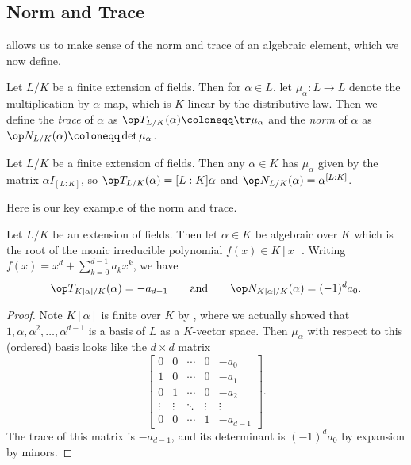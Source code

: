 \documentclass[../notes.tex]{subfiles}
\begin{document}
\subsection{Norm and Trace}
 allows us to make sense of the norm and trace of an algebraic element, which we now define.
\begin{definition}
	Let $L/K$ be a finite extension of fields. Then for $\alpha\in L$, let $\mu_\alpha\colon L\to L$ denote the multiplication-by-$\alpha$ map, which is $K$-linear by the distributive law. Then we define the \textit{trace} of $\alpha$ as $\op T_{L/K}(\alpha)\coloneqq\tr\mu_\alpha$ and the \textit{norm} of $\alpha$ as $\op N_{L/K}(\alpha)\coloneqq\det\mu_\alpha$.
\end{definition}
\begin{example}
	Let $L/K$ be a finite extension of fields. Then any $\alpha\in K$ has $\mu_\alpha$ given by the matrix $\alpha I_{[L:K]}$, so $\op T_{L/K}(\alpha)=[L:K]\alpha$ and $\op N_{L/K}(\alpha)=\alpha^{[L:K]}$.
\end{example}
Here is our key example of the norm and trace.
\begin{proposition} \label{prop:norm-and-tr-by-min-poly}
	Let $L/K$ be an extension of fields. Then let $\alpha\in K$ be algebraic over $K$ which is the root of the monic irreducible polynomial $f(x)\in K[x]$. Writing $f(x)=x^d+\sum_{k=0}^{d-1}a_kx^k$, we have
	\[\op T_{K[\alpha]/K}(\alpha)=-a_{d-1}\qquad\text{and}\qquad\op N_{K[\alpha]/K}(\alpha)=(-1)^da_0.\]
\end{proposition}
\begin{proof}
	Note $K[\alpha]$ is finite over $K$ by , where we actually showed that $1,\alpha,\alpha^2,\ldots,\alpha^{d-1}$ is a basis of $L$ as a $K$-vector space. Then $\mu_\alpha$ with respect to this (ordered) basis looks like the $d\times d$ matrix
	\begin{equation}
		\begin{bmatrix}
			0 & 0 & \cdots & 0 & -a_0 \\
			1 & 0 & \cdots & 0 & -a_1 \\
			0 & 1 & \cdots & 0 & -a_2 \\
			\vdots & \vdots & \ddots & \vdots & \vdots \\
			0 & 0 & \cdots & 1 & -a_{d-1}
		\end{bmatrix}. \label{eq:mu-alpha-in-k-alpha}
	\end{equation}
	The trace of this matrix is $-a_{d-1}$, and its determinant is $(-1)^da_0$ by expansion by minors.
\end{proof}
\end{document}

